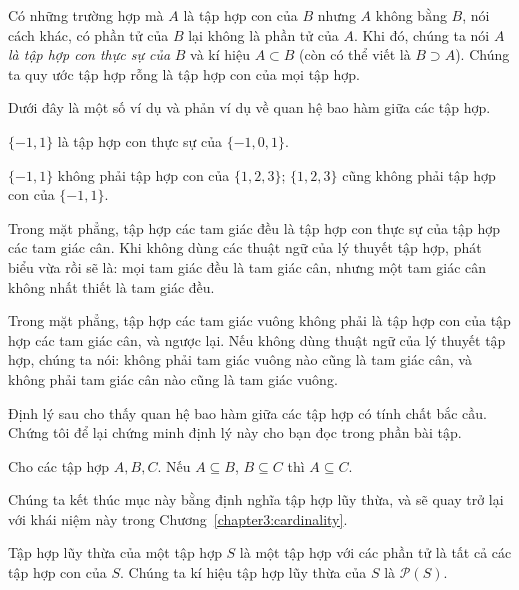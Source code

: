 Có những trường hợp mà $A$ là tập hợp con của $B$ nhưng $A$ không bằng $B$, nói cách khác, có phần tử của $B$ lại không là phần tử của $A$. Khi đó, chúng ta nói $A$ \textit{là tập hợp con thực sự của} $B$ và kí hiệu $A\subset B$ (còn có thể viết là $B\supset A$). Chúng ta quy ước tập hợp rỗng là tập hợp con của mọi tập hợp.

Dưới đây là một số ví dụ và phản ví dụ về quan hệ bao hàm giữa các tập hợp.

\begin{example}
    $\{ -1, 1 \}$ là tập hợp con thực sự của $\{ -1, 0, 1 \}$.
\end{example}

\begin{counterexample}
    $\{ -1, 1 \}$ không phải tập hợp con của $\{ 1, 2, 3 \}$; $\{ 1, 2, 3 \}$ cũng không phải tập hợp con của $\{ -1, 1 \}$.
\end{counterexample}

\begin{example}
    Trong mặt phẳng, tập hợp các tam giác đều là tập hợp con thực sự của tập hợp các tam giác cân. Khi không dùng các thuật ngữ của lý thuyết tập hợp, phát biểu vừa rồi sẽ là: mọi tam giác đều là tam giác cân, nhưng một tam giác cân không nhất thiết là tam giác đều.
\end{example}

\begin{counterexample}
    Trong mặt phẳng, tập hợp các tam giác vuông không phải là tập hợp con của tập hợp các tam giác cân, và ngược lại. Nếu không dùng thuật ngữ của lý thuyết tập hợp, chúng ta nói: không phải tam giác vuông nào cũng là tam giác cân, và không phải tam giác cân nào cũng là tam giác vuông.
\end{counterexample}

Định lý sau cho thấy quan hệ bao hàm giữa các tập hợp có tính chất bắc cầu. Chứng tôi để lại chứng minh định lý này cho bạn đọc trong phần bài tập.

\begin{theorem}
    Cho các tập hợp $A, B, C$. Nếu $A\subseteq B$, $B\subseteq C$ thì $A\subseteq C$.
\end{theorem}

Chúng ta kết thúc mục này bằng định nghĩa tập hợp lũy thừa, và sẽ quay trở lại với khái niệm này trong Chương~\ref{chapter3:cardinality}.

\begin{definition}
    Tập hợp lũy thừa của một tập hợp $S$ là một tập hợp với các phần tử là tất cả các tập hợp con của $S$. Chúng ta kí hiệu tập hợp lũy thừa của $S$ là $\mathcal{P}(S)$.
\end{definition}

